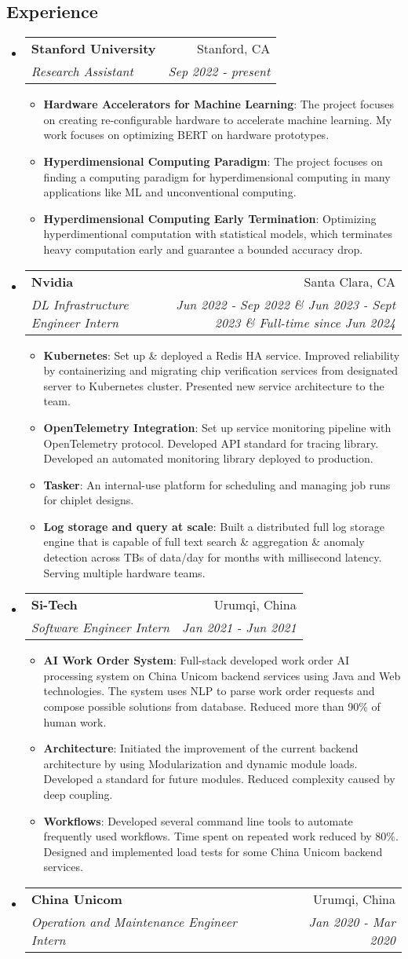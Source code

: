 \documentclass[letterpaper,11pt]{article}
\makeatletter
\newcommand{\resumeItem}[2]{
  \item\small{
    \textbf{#1}{: #2 \vspace{-2pt}}
  }
}
\newcommand{\resumeSubheading}[4]{
  \vspace{-1pt}\item
    \begin{tabular*}{0.97\textwidth}[t]{l@{\extracolsep{\fill}}r}
      \textbf{#1} & #2 \\
      \textit{\small#3} & \textit{\small #4} \\
    \end{tabular*}\vspace{-5pt}
}
\newcommand{\resumeSubHeadingListStart}{\begin{itemize}[leftmargin=*]}
\newcommand{\resumeSubHeadingListEnd}{\end{itemize}}
\newcommand{\resumeItemListStart}{\begin{itemize}}
\newcommand{\resumeItemListEnd}{\end{itemize}\vspace{-5pt}}
\makeatother
\begin{document}
\begin{CJK*}{UTF8}{gbsn}
\section{Experience}
  \resumeSubHeadingListStart
    \resumeSubheading
      {Stanford University}{Stanford, CA}
      {Research Assistant}{Sep 2022 - present}
      \resumeItemListStart
        \resumeItem{Hardware Accelerators for Machine Learning}
          {The project focuses on creating re-configurable hardware to accelerate machine learning. My work focuses on optimizing BERT on hardware prototypes.}
        \resumeItem{Hyperdimensional Computing Paradigm}
          {The project focuses on finding a computing paradigm for hyperdimensional computing in many applications like ML and unconventional computing.}
        \resumeItem{Hyperdimensional Computing Early Termination}
          {Optimizing hyperdimentional computation with statistical models, which terminates heavy computation early and guarantee a bounded accuracy drop.}
      \resumeItemListEnd
    \resumeSubheading
      {Nvidia}{Santa Clara, CA}
      {DL Infrastructure Engineer Intern}{Jun 2022 - Sep 2022 \& Jun 2023 - Sept 2023 \& Full-time since Jun 2024}
      \resumeItemListStart
        \resumeItem{Kubernetes}
          {Set up \& deployed a Redis HA service. Improved reliability by containerizing and migrating chip verification services from designated server to Kubernetes cluster. Presented new service architecture to the team.}
        \resumeItem{OpenTelemetry Integration}
          {Set up service monitoring pipeline with OpenTelemetry protocol. Developed API standard for tracing library. Developed an automated monitoring library deployed to production.}
        \resumeItem{Tasker}
          {An internal-use platform for scheduling and managing job runs for chiplet designs.}
        \resumeItem{Log storage and query at scale}
          {Built a distributed full log storage engine that is capable of full text search \& aggregation \& anomaly detection across TBs of data/day for months with millisecond latency. Serving multiple hardware teams.}
      \resumeItemListEnd
    \resumeSubheading
      {Si-Tech}{Urumqi, China}
      {Software Engineer Intern}{Jan 2021 - Jun 2021}
      \resumeItemListStart
        \resumeItem{AI Work Order System}
          {Full-stack developed work order AI processing system on China Unicom backend services using Java and Web technologies. The system uses NLP to parse work order requests and compose possible solutions from database. Reduced more than 90\% of human work.}
        \resumeItem{Architecture}
          {Initiated the improvement of the current backend architecture by using Modularization and dynamic module loads. Developed a standard for future modules. Reduced complexity caused by deep coupling.}
        \resumeItem{Workflows}
          {Developed several command line tools to automate frequently used workflows. Time spent on repeated work reduced by 80\%. Designed and implemented load tests for some China Unicom backend services.}
      \resumeItemListEnd
    \resumeSubheading
      {China Unicom}{Urumqi, China}
      {Operation and Maintenance Engineer Intern}{Jan 2020 - Mar 2020}
  \resumeSubHeadingListEnd

\end{CJK*}
\end{document}
